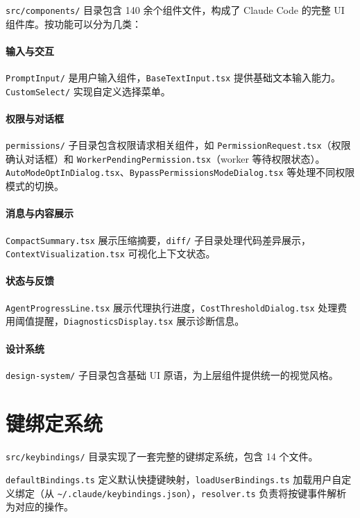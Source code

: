 \texttt{src/components/} 目录包含 140 余个组件文件，构成了 Claude Code 的完整 UI 组件库。按功能可以分为几类：

\paragraph{输入与交互}

\texttt{PromptInput/} 是用户输入组件，\texttt{BaseTextInput.tsx} 提供基础文本输入能力。\texttt{CustomSelect/} 实现自定义选择菜单。

\paragraph{权限与对话框}

\texttt{permissions/} 子目录包含权限请求相关组件，如 \texttt{PermissionRequest.tsx}（权限确认对话框）和 \texttt{WorkerPendingPermission.tsx}（worker 等待权限状态）。\texttt{AutoModeOptInDialog.tsx}、\texttt{BypassPermissionsModeDialog.tsx} 等处理不同权限模式的切换。

\paragraph{消息与内容展示}

\texttt{CompactSummary.tsx} 展示压缩摘要，\texttt{diff/} 子目录处理代码差异展示，\texttt{ContextVisualization.tsx} 可视化上下文状态。

\paragraph{状态与反馈}

\texttt{AgentProgressLine.tsx} 展示代理执行进度，\texttt{CostThresholdDialog.tsx} 处理费用阈值提醒，\texttt{DiagnosticsDisplay.tsx} 展示诊断信息。

\paragraph{设计系统}

\texttt{design-system/} 子目录包含基础 UI 原语，为上层组件提供统一的视觉风格。

\section{键绑定系统}

\texttt{src/keybindings/} 目录实现了一套完整的键绑定系统，包含 14 个文件。

\texttt{defaultBindings.ts} 定义默认快捷键映射，\texttt{loadUserBindings.ts} 加载用户自定义绑定（从 \texttt{\~{}/.claude/keybindings.json}），\texttt{resolver.ts} 负责将按键事件解析为对应的操作。

